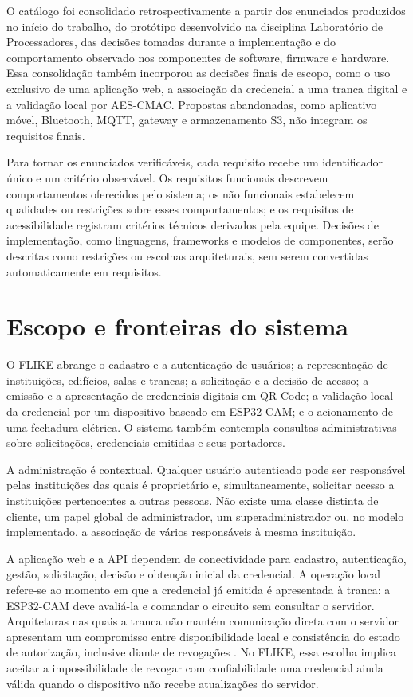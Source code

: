 O catálogo foi consolidado retrospectivamente a partir dos enunciados produzidos no início do trabalho, do protótipo desenvolvido na disciplina Laboratório de Processadores, das decisões tomadas durante a implementação e do comportamento observado nos componentes de software, firmware e hardware. Essa consolidação também incorporou as decisões finais de escopo, como o uso exclusivo de uma aplicação web, a associação da credencial a uma tranca digital e a validação local por AES-CMAC. Propostas abandonadas, como aplicativo móvel, Bluetooth, MQTT, gateway e armazenamento S3, não integram os requisitos finais.

Para tornar os enunciados verificáveis, cada requisito recebe um identificador único e um critério observável. Os requisitos funcionais descrevem comportamentos oferecidos pelo sistema; os não funcionais estabelecem qualidades ou restrições sobre esses comportamentos; e os requisitos de acessibilidade registram critérios técnicos derivados pela equipe. Decisões de implementação, como linguagens, frameworks e modelos de componentes, serão descritas como restrições ou escolhas arquiteturais, sem serem convertidas automaticamente em requisitos.

\section{Escopo e fronteiras do sistema}

O FLIKE abrange o cadastro e a autenticação de usuários; a representação de instituições, edifícios, salas e trancas; a solicitação e a decisão de acesso; a emissão e a apresentação de credenciais digitais em QR Code; a validação local da credencial por um dispositivo baseado em ESP32-CAM; e o acionamento de uma fechadura elétrica. O sistema também contempla consultas administrativas sobre solicitações, credenciais emitidas e seus portadores.

A administração é contextual. Qualquer usuário autenticado pode ser responsável pelas instituições das quais é proprietário e, simultaneamente, solicitar acesso a instituições pertencentes a outras pessoas. Não existe uma classe distinta de cliente, um papel global de administrador, um superadministrador ou, no modelo implementado, a associação de vários responsáveis à mesma instituição.

A aplicação web e a API dependem de conectividade para cadastro, autenticação, gestão, solicitação, decisão e obtenção inicial da credencial. A operação local refere-se ao momento em que a credencial já emitida é apresentada à tranca: a ESP32-CAM deve avaliá-la e comandar o circuito sem consultar o servidor. Arquiteturas nas quais a tranca não mantém comunicação direta com o servidor apresentam um compromisso entre disponibilidade local e consistência do estado de autorização, inclusive diante de revogações \cite{ho2016smartlocks}. No FLIKE, essa escolha implica aceitar a impossibilidade de revogar com confiabilidade uma credencial ainda válida quando o dispositivo não recebe atualizações do servidor.

